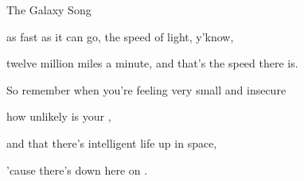 \begin{SBSong}{The Galaxy Song}
\begin{SBVerse}
    as fast as it can go, the speed of light, y'know,

    twelve million miles a minute, and that's the  speed there is.

    So remember when you're feeling very small and insecure

    how  unlikely is your ,

    and  that there's intelligent life  up in space,

    'cause there's  down here on .
  \end{SBVerse}
\end{SBSong}
